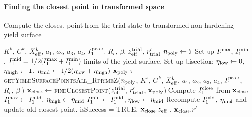 \paragraph{Finding the closest point in transformed space}
\begin{breakablealgorithm}
\caption{Compute the closest point from the trial state to transformed non-hardening yield surface}
\begin{algorithmic}[1]
  \Require $K^k$, $G^k$, $X_{\text{eff}}^k$, $a_1$, $a_2$, $a_3$, $a_4$, $I_1^{\text{peak}}$, $R_c$, $\beta$,
           $z_{\text{eff}}^{\text{trial}}$, $r'_{\text{trial}}$
    \State $n_{\text{poly}} \leftarrow 5$
    \State Set up $I_1^{\text{max}}$, $I_1^{\text{min}}$, $I_1^{\text{mid}}=1/2(I_1^{\text{max}}+I_1^{\text{min}})$ limits of the yield surface.
    \State Set up bisection: $\eta_{\text{low}} \leftarrow 0$, $\eta_{\text{high}} \leftarrow 1$, 
           $\eta_{\text{mid}} \leftarrow 1/2(\eta_{\text{low}} + \eta_{\text{high}})$
      \State $\mathbf{x}_{\text{poly}} \leftarrow $ \textsc{getYieldSurfacePointsAll\_RprimeZ}($n_{\text{poly}}$, 
        $K^k$, $G^k$, $X_{\text{eff}}^k$, \WRP $a_1$, $a_2$, $a_3$, $a_4$, $I_1^{\text{peak}}$, $R_c$, $\beta$ ) \WRP
      \State $\mathbf{x}_{\text{close}} \leftarrow $ \textsc{findClosestPoint}($z_{\text{eff}}^{\text{trial}}$, $r'_{\text{trial}}$,
                                                                $\mathbf{x}_{\text{poly}}$) \WRP
      \State Compute $I_1^{\text{close}}$ from $\mathbf{x}_{\text{close}}$
        \State $I_1^{\text{max}} \leftarrow I_1^{\text{mid}}$, $\eta_{\text{high}} \leftarrow \eta_{\text{mid}}$
      \Else
        \State $I_1^{\text{min}} \leftarrow I_1^{\text{mid}}$, $\eta_{\text{low}} \leftarrow \eta_{\text{mid}}$
      \EndIf
      \State Recompute $I_1^{\text{mid}}$, $\eta_{\text{mid}}$ and update old closest point.
    \EndWhile
    \State \Return isSuccess = TRUE, $\mathbf{x}_{\text{close}}.z_{\text{eff}}$ , $\mathbf{x}_{\text{close}}.r'$ 
  \EndProcedure
\end{algorithmic}
\end{breakablealgorithm}


